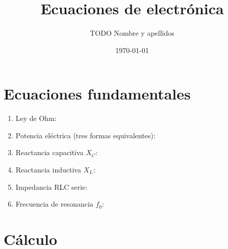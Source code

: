 \documentclass[12pt,a4paper]{article}
\title{Ecuaciones de electrónica}
\author{TODO Nombre y apellidos}
\date{\today}
\begin{document}
\maketitle

\section{Ecuaciones fundamentales}
\begin{enumerate}
  \item Ley de Ohm: %
  \item Potencia eléctrica (tres formas equivalentes): %
  \item Reactancia capacitiva $X_C$: %
  \item Reactancia inductiva $X_L$: %
  \item Impedancia RLC serie: %
  \item Frecuencia de resonancia $f_0$: %
\end{enumerate}

\section{Cálculo}
\end{document}

